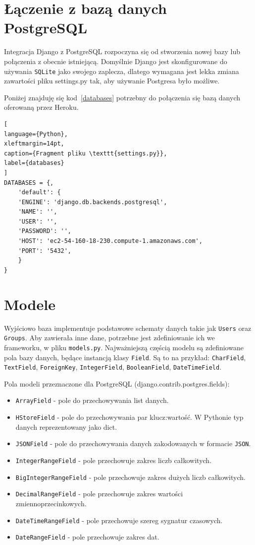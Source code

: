 \documentclass[oneside,polski,logo,indent]{amuthesis}
\begin{document}
\section{Łączenie z bazą danych PostgreSQL}
Integracja Django z PostgreSQL rozpoczyna się od stworzenia nowej bazy lub połączenia z obecnie istniejącą.
Domyślnie Django jest skonfigurowane do używania \texttt{SQLite} jako swojego zaplecza, dlatego wymagana jest lekka zmiana zawartości pliku settings.py tak, aby używanie Postgresa było możliwe. 

Poniżej znajduję się kod~\ref{databases} potrzebny do połączenia się bazą danych oferowaną przez Heroku.  
\begin{lstlisting}[
language={Python},
xleftmargin=14pt,
caption={Fragment pliku \texttt{settings.py}},
label={databases}
]
DATABASES = {,  
	'default': { 
	'ENGINE': 'django.db.backends.postgresql', 
	'NAME': '', 
	'USER': '', 
	'PASSWORD': '', 
	'HOST': 'ec2-54-160-18-230.compute-1.amazonaws.com', 
	'PORT': '5432', 
	} 
} 
\end{lstlisting}
\section{Modele}

Wyjściowo baza implementuje podstawowe schematy danych takie jak  \texttt{Users} oraz \texttt{Groups}. Aby zawierała inne dane, potrzebne jest zdefiniowanie ich we frameworku, w pliku \texttt{models.py}.
Najważniejszą częścią modelu są zdefiniowane pola bazy danych, będące instancją klasy \texttt{Field}. Są to na przykład: \texttt{CharField}, \texttt{TextField}, \texttt{ForeignKey}, \texttt{IntegerField}, \texttt{BooleanField}, \texttt{DateTimeField}.

Pola modeli przeznaczone dla PostgreSQL (django.contrib.postgres.fields):

\begin{itemize}
	\item \texttt{ArrayField} - pole do przechowywania list danych.
	\item \texttt{HStoreField} - pole do przechowywania par klucz:wartość. W Pythonie typ danych reprezentowany jako dict.
	\item \texttt{JSONField} - pole do przechowywania danych zakodowanych w formacie \texttt{JSON}.
	\item \texttt{IntegerRangeField} - pole przechowuje zakres liczb całkowitych.
	\item \texttt{BigIntegerRangeField} - pole przechowuje zakres dużych liczb całkowitych.
	\item \texttt{DecimalRangeField} - pole przechowuje zakres wartości zmiennoprzecinkowych.
	\item \texttt{DateTimeRangeField} - pole przechowuje szereg sygnatur czasowych.
	\item \texttt{DateRangeField} - pole przechowuje zakres dat.
\end{itemize}
\end{document}
